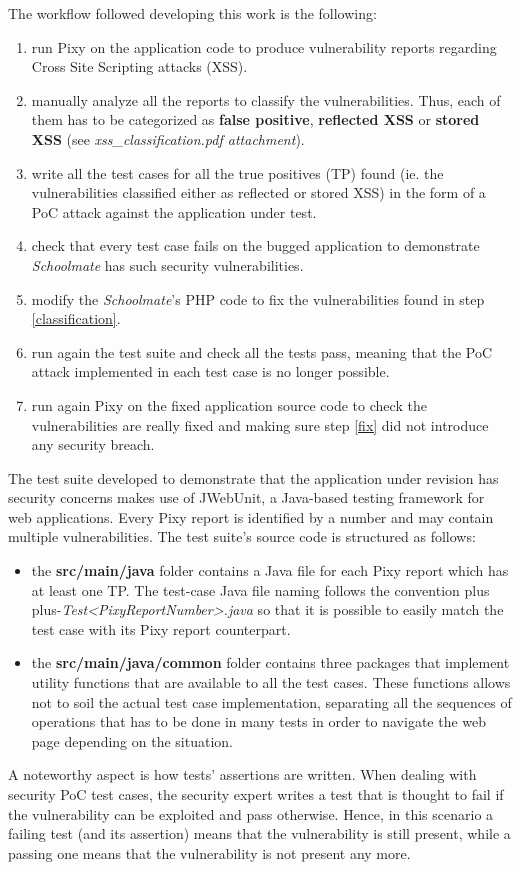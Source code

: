 \documentclass{sig-alternate-05-2015}
\newcommand\lword[1]{\leavevmode\nobreak\hskip0pt plus\linewidth\penalty50\hskip0pt plus-\linewidth\nobreak#1}
\begin{document}
The workflow followed developing this work is the following:
\begin{enumerate}
    \item run Pixy on the application code to produce vulnerability reports
        regarding Cross Site Scripting attacks (XSS).
    \item \label{classification} manually analyze all the reports to classify the vulnerabilities.
        Thus, each of them has to be categorized as \textbf{false positive},
        \textbf{reflected XSS} or \textbf{stored XSS} (see \emph{xss\_classification.pdf
        attachment}).
    \item write all the test cases for all the true positives (TP) found (ie. the
        vulnerabilities classified either as reflected or stored XSS) in the form
        of a PoC attack against the application under test.
    \item check that every test case fails on the bugged application to demonstrate
        \emph{Schoolmate} has such security vulnerabilities.
    \item \label{fix} modify the \emph{Schoolmate}'s PHP code to fix the vulnerabilities found
        in step \ref{classification}.
    \item run again the test suite and check all the tests pass, meaning that
        the PoC attack implemented in each test case is no longer possible.
    \item run again Pixy on the fixed application source code to check the
        vulnerabilities are really fixed and making sure step \ref{fix} did not
        introduce any security breach.
\end{enumerate}
The test suite developed to demonstrate that the application under revision has
security concerns makes use of JWebUnit, a Java-based testing framework for web
applications. Every Pixy report is identified by a number and may contain multiple
vulnerabilities. The test suite's source code is structured as follows:
\begin{itemize}
    \item the \textbf{src/main/java} folder contains a Java file for each Pixy report which
        has at least one TP. The test-case Java file naming follows the convention
        \lword{\emph{Test<PixyReportNumber>.java}} so that it is possible to easily match the test
        case with its Pixy report counterpart.
    \item the \textbf{src/main/java/common} folder contains three packages that implement
        utility functions that are available to all the test cases. These functions
        allows not to soil the actual test case implementation, separating all the
        sequences of operations that has to be done in many tests in order to navigate
        the web page depending on the situation.
\end{itemize}
A noteworthy aspect is how tests' assertions are written. When dealing with
security PoC test cases, the security expert writes a test that is thought to fail
if the vulnerability can be exploited and pass otherwise. Hence, in this scenario
a failing test (and its assertion) means that the vulnerability is still present,
while a passing one means that the vulnerability is not present any more.
\end{document}
